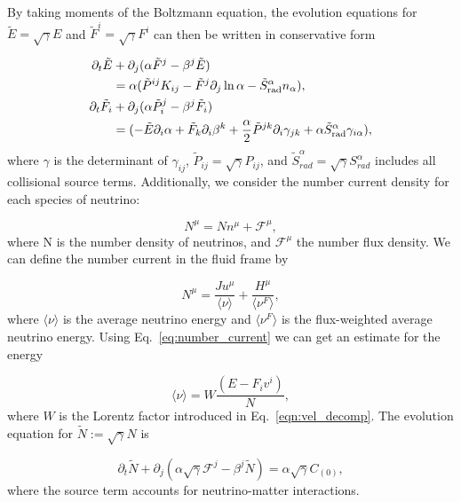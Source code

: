 By taking moments of the Boltzmann equation, the evolution equations for $\tilde E = \sqrt{\gamma}E$ and $\tilde F^i = \sqrt{\gamma} F^i$ can then be written in conservative form

\begin{align}
  \partial_t \tilde E &+ \partial_j (\alpha \tilde F^j - \beta^j \tilde E) \\
  &= \alpha(\tilde P^{ij} K_{ij} - \tilde F^j \partial_j \ln \alpha - \tilde S_\text{rad}^\alpha n_\alpha), \notag\\
  \partial_t \tilde F_i &+ \partial_j (\alpha \tilde P_i^j - \beta^j \tilde F_i) \\
  &= (-\tilde{E} \partial_i \alpha + \tilde{F}_k \partial_i \beta^k + \frac{\alpha}{2} \tilde{P}^{jk} \partial_i \gamma_{jk} + \alpha \tilde{S}_{\text{rad}}^\alpha \gamma_{i\alpha}) \notag,
\end{align}
%
where $\gamma$ is the determinant of $\gamma_{ij}$, $\tilde{P}_{ij} = \sqrt{\gamma}P_{ij}$, and $\tilde{S}_{rad}^\alpha = \sqrt{\gamma} S_{rad}^\alpha$ includes all collisional source terms. Additionally, we consider the number current density for each species of neutrino:

\begin{equation}
  N^\mu = Nn^\mu + \mathcal{F}^\mu,
\end{equation}
%
where N is the number density of neutrinos, and $\mathcal{F}^\mu$ the number flux density. We can define the number current in the fluid frame by

\begin{equation}
  N^\mu = \frac{Ju^\mu}{\langle \nu \rangle} + \frac{H^\mu}{\langle \nu^F \rangle},
  \label{eq:number_current}
\end{equation}
%
where $\langle \nu \rangle$ is the average neutrino energy and $\langle \nu^F \rangle$ is the flux-weighted average neutrino energy. Using Eq.~\ref{eq:number_current} we can get an estimate for the energy

\begin{equation}
\langle \nu \rangle = W\frac{(E-F_iv^i)}{N},
\end{equation}
%
where $W$ is the Lorentz factor introduced in Eq.~\ref{eqn:vel_decomp}. The evolution equation for $\tilde{N} := \sqrt{\gamma}N$ is

\begin{equation}
  \partial_t \tilde N + \partial_j(\alpha \sqrt{\gamma} \mathcal{F}^j - \beta^j \tilde N) = \alpha \sqrt{\gamma} C_{(0)},
\end{equation}
where the source term accounts for neutrino-matter interactions.

